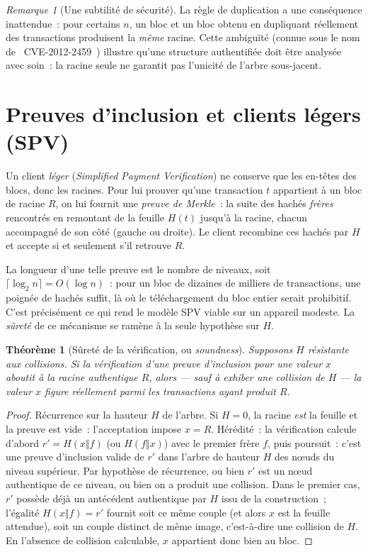 \documentclass[11pt,a4paper]{article}
\theoremstyle{definition}\newtheorem{definition}{Définition}
\theoremstyle{plain}\newtheorem{theoreme}{Théorème}\newtheorem{proposition}{Proposition}
\theoremstyle{remark}\newtheorem{remarque}{Remarque}
\begin{document}
\begin{remarque}[Une subtilité de sécurité]\label{rem:cve}
La règle de duplication a une conséquence inattendue~: pour certains $n$, un bloc et un bloc
obtenu en dupliquant réellement des transactions produisent la \emph{même} racine. Cette
ambiguïté (connue sous le nom de \guillemotleft~CVE-2012-2459~\guillemotright) illustre qu'une
structure authentifiée doit être analysée avec soin~: la racine seule ne garantit pas l'unicité de
l'arbre sous-jacent.
\end{remarque}

\section{Preuves d'inclusion et clients légers (SPV)}

Un client \emph{léger} (\emph{Simplified Payment Verification}) ne conserve que les en-têtes des
blocs, donc les racines. Pour lui prouver qu'une transaction $t$ appartient à un bloc de racine
$R$, on lui fournit une \emph{preuve de Merkle}~: la suite des hachés \emph{frères} rencontrés en
remontant de la feuille $H(t)$ jusqu'à la racine, chacun accompagné de son côté (gauche ou
droite). Le client recombine ces hachés par $H$ et accepte si et seulement s'il retrouve $R$.

La longueur d'une telle preuve est le nombre de niveaux, soit $\lceil\log_2 n\rceil=O(\log n)$~:
pour un bloc de dizaines de milliers de transactions, une poignée de hachés suffit, là où le
téléchargement du bloc entier serait prohibitif. C'est précisément ce qui rend le modèle SPV
viable sur un appareil modeste. La \emph{sûreté} de ce mécanisme se ramène à la seule hypothèse
sur $H$.

\begin{theoreme}[Sûreté de la vérification, ou \emph{soundness}]\label{th:soundness}
Supposons $H$ résistante aux collisions. Si la vérification d'une preuve d'inclusion pour une
valeur $x$ aboutit à la racine authentique $R$, alors --- sauf à exhiber une collision de $H$ ---
la valeur $x$ figure réellement parmi les transactions ayant produit $R$.
\end{theoreme}
\begin{proof}
Récurrence sur la hauteur $H$ de l'arbre. Si $H=0$, la racine \emph{est} la feuille et la preuve
est vide~: l'acceptation impose $x=R$. Hérédité~: la vérification calcule d'abord
$r'=H(x\Vert f)$ (ou $H(f\Vert x)$) avec le premier frère $f$, puis poursuit~: c'est une preuve
d'inclusion valide de $r'$ dans l'arbre de hauteur $H$ des n\oe uds du niveau supérieur. Par
hypothèse de récurrence, ou bien $r'$ est un n\oe ud authentique de ce niveau, ou bien on a
produit une collision. Dans le premier cas, $r'$ possède déjà un antécédent authentique par $H$
issu de la construction~; l'égalité $H(x\Vert f)=r'$ fournit soit ce même couple (et alors $x$ est
la feuille attendue), soit un couple distinct de même image, c'est-à-dire une collision de $H$.
En l'absence de collision calculable, $x$ appartient donc bien au bloc.
\end{proof}
\end{document}

